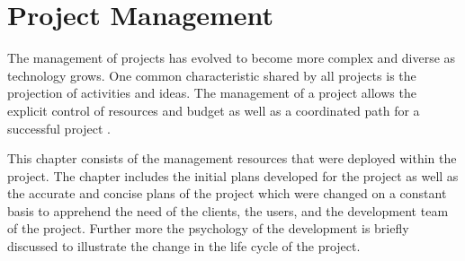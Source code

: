 \chapter{Project Management}
\label{cha:project_management}

The management of projects has evolved to become more complex and diverse as
technology grows. One common characteristic shared by all projects is the
projection of activities and ideas. The management of a project allows the
explicit control of resources and budget as well as a coordinated path for a
successful project \citep{projMan86}.

This chapter consists of the management resources that were deployed within the
project. The chapter includes the initial plans developed for the project as
well as the accurate and concise plans of the project which were changed on a
constant basis to apprehend the need of the clients, the users, and the
development team of the project. Further more the psychology of the development
is briefly discussed to illustrate the change in the life cycle of the project.

\newpage 


\newpage 


\newpage 


\newpage 


\newpage


\newpage 


\newpage 


%

%
